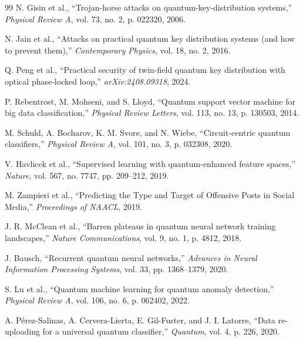 \documentclass[10pt, journal, letterpaper, twocolumn]{IEEEtran}
\begin{document}
\begin{thebibliography}{99}
N. Gisin et al., ``Trojan-horse attacks on quantum-key-distribution systems,'' \emph{Physical Review A}, vol. 73, no. 2, p. 022320, 2006.

N. Jain et al., ``Attacks on practical quantum key distribution systems (and how to prevent them),'' \emph{Contemporary Physics}, vol. 18, no. 2, 2016.

Q. Peng et al., ``Practical security of twin-field quantum key distribution with optical phase-locked loop,'' \emph{arXiv:2408.09318}, 2024.

P. Rebentrost, M. Mohseni, and S. Lloyd, ``Quantum support vector machine for big data classification,'' \emph{Physical Review Letters}, vol. 113, no. 13, p. 130503, 2014.

M. Schuld, A. Bocharov, K. M. Svore, and N. Wiebe, ``Circuit-centric quantum classifiers,'' \emph{Physical Review A}, vol. 101, no. 3, p. 032308, 2020.

V. Havlicek et al., ``Supervised learning with quantum-enhanced feature spaces,'' \emph{Nature}, vol. 567, no. 7747, pp. 209--212, 2019.

M. Zampieri et al., ``Predicting the Type and Target of Offensive Posts in Social Media,'' \emph{Proceedings of NAACL}, 2019.

J. R. McClean et al., ``Barren plateaus in quantum neural network training landscapes,'' \emph{Nature Communications}, vol. 9, no. 1, p. 4812, 2018.

J. Bausch, ``Recurrent quantum neural networks,'' \emph{Advances in Neural Information Processing Systems}, vol. 33, pp. 1368--1379, 2020.

S. Lu et al., ``Quantum machine learning for quantum anomaly detection,'' \emph{Physical Review A}, vol. 106, no. 6, p. 062402, 2022.

A. Pérez-Salinas, A. Cervera-Lierta, E. Gil-Fuster, and J. I. Latorre, ``Data re-uploading for a universal quantum classifier,'' \emph{Quantum}, vol. 4, p. 226, 2020.

\end{thebibliography}
\end{document}
